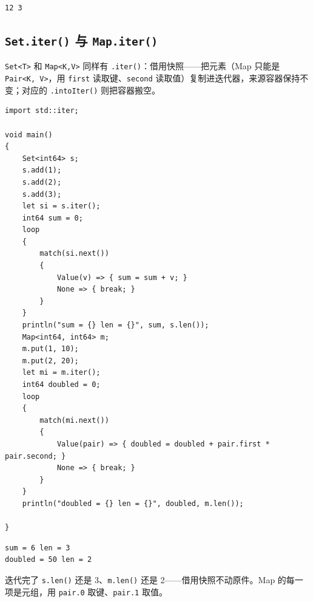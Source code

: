 \par
\medskip
\begin{lstlisting}[style=out]
12 3
\end{lstlisting}
\par
\medskip

\subsection*{\texttt{Set.\allowbreak{}iter(\allowbreak{})\allowbreak{}} 与 \texttt{Map.\allowbreak{}iter(\allowbreak{})\allowbreak{}}}

\texttt{Set<\allowbreak{}T>\allowbreak{}} 和 \texttt{Map<\allowbreak{}K,\allowbreak{}V>\allowbreak{}} 同样有 \texttt{.\allowbreak{}iter(\allowbreak{})\allowbreak{}}：借用快照——把元素（Map 只能是 \texttt{Pair<\allowbreak{}K,\allowbreak{} V>\allowbreak{}}，用 \texttt{first} 读取键、\texttt{second} 读取值）复制进迭代器，来源容器保持不变；对应的 \texttt{.\allowbreak{}into\allowbreak{}Iter(\allowbreak{})\allowbreak{}} 则把容器搬空。

\par
\medskip
\begin{lstlisting}[style=chali]
import std::iter;

void main()
{
    Set<int64> s;
    s.add(1);
    s.add(2);
    s.add(3);
    let si = s.iter();
    int64 sum = 0;
    loop
    {
        match(si.next())
        {
            Value(v) => { sum = sum + v; }
            None => { break; }
        }
    }
    println("sum = {} len = {}", sum, s.len());
    Map<int64, int64> m;
    m.put(1, 10);
    m.put(2, 20);
    let mi = m.iter();
    int64 doubled = 0;
    loop
    {
        match(mi.next())
        {
            Value(pair) => { doubled = doubled + pair.first * pair.second; }
            None => { break; }
        }
    }
    println("doubled = {} len = {}", doubled, m.len());

}
\end{lstlisting}
\par
\medskip

\par
\medskip
\begin{lstlisting}[style=out]
sum = 6 len = 3
doubled = 50 len = 2
\end{lstlisting}
\par
\medskip

迭代完了 \texttt{s.\allowbreak{}len(\allowbreak{})\allowbreak{}} 还是 3、\texttt{m.\allowbreak{}len(\allowbreak{})\allowbreak{}} 还是 2——借用快照不动原件。Map 的每一项是元组，用 \texttt{pair.\allowbreak{}0} 取键、\texttt{pair.\allowbreak{}1} 取值。

